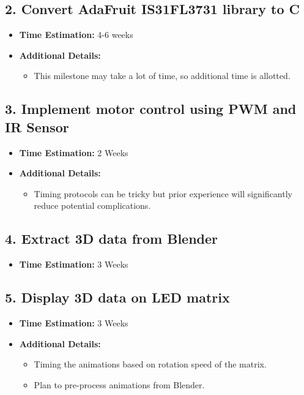 \documentclass[11pt,journal]{IEEEtran}
\begin{document}
\subsection*{2. Convert AdaFruit IS31FL3731 library to C}
\begin{itemize}
  \item \textbf{Time Estimation:} 4-6 weeks
  \item \textbf{Additional Details:} 
  \begin{itemize}
    \item This milestone may take a lot of time, so additional time is allotted.
  \end{itemize}
\end{itemize}

\subsection*{3. Implement motor control using PWM and IR Sensor}
\begin{itemize}
  \item \textbf{Time Estimation:} 2 Weeks
  \item \textbf{Additional Details:} 
  \begin{itemize}
    \item Timing protocols can be tricky but prior experience will significantly reduce potential complications.
  \end{itemize}
\end{itemize}

\subsection*{4. Extract 3D data from Blender}
\begin{itemize}
  \item \textbf{Time Estimation:} 3 Weeks
\end{itemize}

\subsection*{5. Display 3D data on LED matrix}
\begin{itemize}
  \item \textbf{Time Estimation:} 3 Weeks
  \item \textbf{Additional Details:} 
  \begin{itemize}
    \item Timing the animations based on rotation speed of the matrix.
    \item Plan to pre-process animations from Blender.
  \end{itemize}
\end{itemize}
\end{document}
